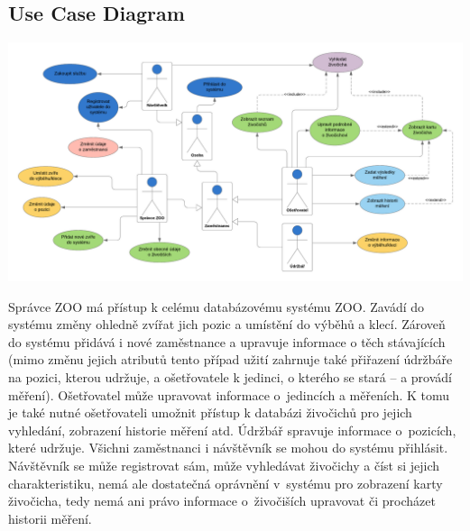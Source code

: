 
\newpage
\begin{landscape}
\section{Use Case Diagram}
\thispagestyle{fancy}
\vfill
\centering \includegraphics[scale=0.85, center]{fig/UCD_ZOO.pdf}
\vfill
\end{landscape}


\newpage

Správce ZOO má přístup k celému databázovému systému ZOO. Zavádí do systému změny ohledně zvířat jich pozic a umístění do výběhů a klecí. Zároveň do systému přidává i nové zaměstnance a upravuje informace o těch stávajících (mimo změnu jejich atributů tento případ užití zahrnuje také přiřazení údržbáře na pozici, kterou udržuje, a ošetřovatele k jedinci, o kterého se stará -- a provádí měření). Ošetřovatel může upravovat informace o~jedincích a měřeních. K tomu je také nutné ošetřovateli umožnit přístup k databázi živočichů pro jejich vyhledání, zobrazení historie měření atd. Údržbář spravuje informace o~pozicích, které udržuje. Všichni zaměstnanci i návštěvník se mohou do systému přihlásit. Návštěvník se může registrovat sám, může vyhledávat živočichy a číst si jejich charakteristiku, nemá ale dostatečná oprávnění v~systému pro zobrazení karty živočicha, tedy nemá ani právo informace o~živočiších upravovat či procházet historii měření.